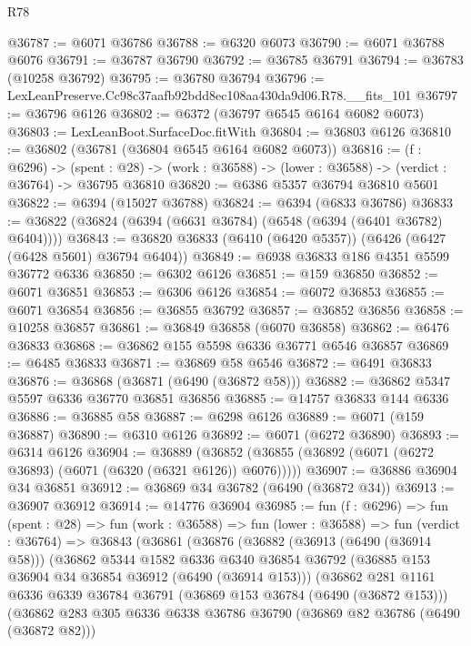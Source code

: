 \begin{lexlean}{R78}
\begin{coremodule}
@36787 := @6071 @36786
@36788 := @6320 @6073
@36790 := @6071 @36788 @6076
@36791 := @36787 @36790
@36792 := @36785 @36791
@36794 := @36783 (@10258 @36792)
@36795 := @36780 @36794
@36796 := LexLeanPreserve.Cc98c37aafb92bdd8ec108aa430da9d06.R78.__fits_101
@36797 := @36796 @6126
@36802 := @6372 (@36797 @6545 @6164 @6082 @6073)
@36803 := LexLeanBoot.SurfaceDoc.fitWith
@36804 := @36803 @6126
@36810 := @36802 (@36781 (@36804 @6545 @6164 @6082 @6073))
@36816 := (f : @6296) ->
  (spent : @28) -> (work : @36588) -> (lower : @36588) -> (verdict : @36764) -> @36795 @36810
@36820 := @6386 @5357 @36794 @36810 @5601
@36822 := @6394 (@15027 @36788)
@36824 := @6394 (@6833 @36786)
@36833 := @36822 (@36824 (@6394 (@6631 @36784) (@6548 (@6394 (@6401 @36782) @6404))))
@36843 := @36820 @36833 (@6410 (@6420 @5357)) (@6426 (@6427 (@6428 @5601) @36794 @6404))
@36849 := @6938 @36833 @186 @4351 @5599 @36772 @6336
@36850 := @6302 @6126
@36851 := @159 @36850
@36852 := @6071 @36851
@36853 := @6306 @6126
@36854 := @6072 @36853
@36855 := @6071 @36854
@36856 := @36855 @36792
@36857 := @36852 @36856
@36858 := @10258 @36857
@36861 := @36849 @36858 (@6070 @36858)
@36862 := @6476 @36833
@36868 := @36862 @155 @5598 @6336 @36771 @6546 @36857
@36869 := @6485 @36833
@36871 := @36869 @58 @6546
@36872 := @6491 @36833
@36876 := @36868 (@36871 (@6490 (@36872 @58)))
@36882 := @36862 @5347 @5597 @6336 @36770 @36851 @36856
@36885 := @14757 @36833 @144 @6336
@36886 := @36885 @58
@36887 := @6298 @6126
@36889 := @6071 (@159 @36887)
@36890 := @6310 @6126
@36892 := @6071 (@6272 @36890)
@36893 := @6314 @6126
@36904 := @36889
    (@36852 (@36855 (@36892 (@6071 (@6272 @36893) (@6071 (@6320 (@6321 @6126)) @6076)))))
@36907 := @36886 @36904 @34 @36851
@36912 := @36869 @34 @36782 (@6490 (@36872 @34))
@36913 := @36907 @36912
@36914 := @14776 @36904
@36985 := fun (f : @6296) =>
  fun (spent : @28) =>
  fun (work : @36588) =>
  fun (lower : @36588) =>
  fun (verdict : @36764) =>
  @36843
    (@36861
      (@36876
        (@36882
          (@36913 (@6490 (@36914 @58)))
          (@36862
            @5344
            @1582
            @6336
            @6340
            @36854
            @36792
            (@36885 @153 @36904 @34 @36854 @36912 (@6490 (@36914 @153)))
            (@36862
              @281
              @1161
              @6336
              @6339
              @36784
              @36791
              (@36869 @153 @36784 (@6490 (@36872 @153)))
              (@36862
                @283
                @305
                @6336
                @6338
                @36786
                @36790
                (@36869 @82 @36786 (@6490 (@36872 @82)))

\end{coremodule}
\end{lexlean}
